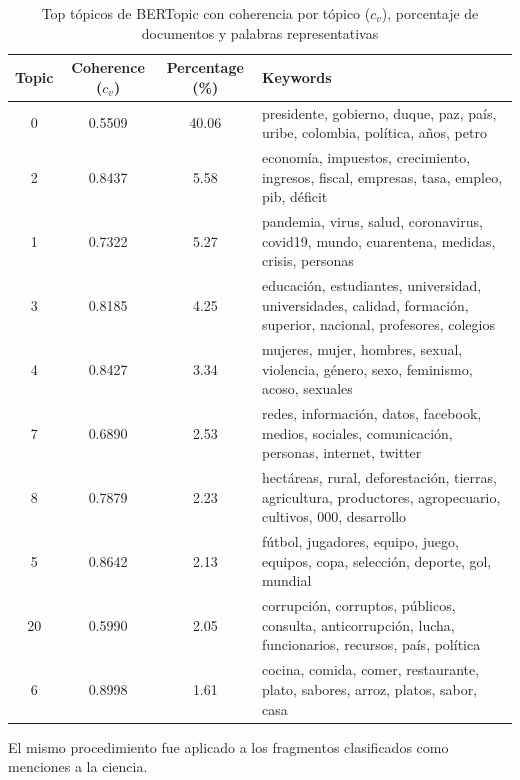 \documentclass[11pt,a4paper]{article}
\begin{document}
		\begin{table}[H]
			\centering
			\small
			\begin{tabularx}{\textwidth}{c c c X}
				\hline
				\textbf{Topic} & \textbf{Coherence  ($c_v$)} & \textbf{Percentage (\%)} & \textbf{Keywords} \\
				\hline
				0  & 0.5509 & 40.06 & presidente, gobierno, duque, paz, país, uribe, colombia, política, años, petro \\
				2  & 0.8437 & 5.58  & economía, impuestos, crecimiento, ingresos, fiscal, empresas, tasa, empleo, pib, déficit \\
				1  & 0.7322 & 5.27  & pandemia, virus, salud, coronavirus, covid19, mundo, cuarentena, medidas, crisis, personas \\
				3  & 0.8185 & 4.25  & educación, estudiantes, universidad, universidades, calidad, formación, superior, nacional, profesores, colegios \\
				4  & 0.8427 & 3.34  & mujeres, mujer, hombres, sexual, violencia, género, sexo, feminismo, acoso, sexuales \\
				7  & 0.6890 & 2.53  & redes, información, datos, facebook, medios, sociales, comunicación, personas, internet, twitter \\
				8  & 0.7879 & 2.23  & hectáreas, rural, deforestación, tierras, agricultura, productores, agropecuario, cultivos, 000, desarrollo \\
				5  & 0.8642 & 2.13  & fútbol, jugadores, equipo, juego, equipos, copa, selección, deporte, gol, mundial \\
				20 & 0.5990 & 2.05  & corrupción, corruptos, públicos, consulta, anticorrupción, lucha, funcionarios, recursos, país, política \\
				6  & 0.8998 & 1.61  & cocina, comida, comer, restaurante, plato, sabores, arroz, platos, sabor, casa \\
				\hline
			\end{tabularx}
			\caption{Top tópicos de BERTopic con coherencia por tópico ($c_v$), porcentaje de documentos y palabras representativas}
			\label{tab:bertopic_coherence_top}
		\end{table}
		
		El mismo procedimiento fue aplicado a los fragmentos clasificados como menciones a la ciencia. 
		
\end{document}
